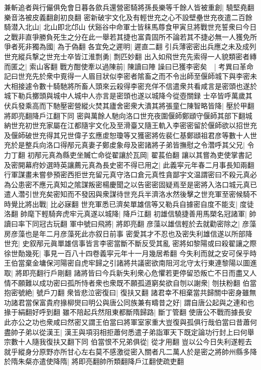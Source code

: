 兼斬追者與行儼俱免會日暮各歛兵還營密騎將孫長樂等千餘人皆被重創|{
	驍堅堯翻樂音洛被皮義翻創初良翻}
密新破宇文化及有輕世充之心不設壁壘世充夜遣二百餘騎潜入北山|{
	北山即北邙山}
伏谿谷中命軍士皆秣馬蓐食甲寅旦將戰世充誓衆曰今日之戰非直爭勝負死生之分在此一舉若其捷也富貴固所不論若其不捷必無一人獲免所爭者死非獨為國|{
	為于偽翻}
各宜免之遲明|{
	遲直二翻}
引兵薄密密出兵應之未及成列世充縱兵撃之世充士卒皆江淮剽勇|{
	剽匹妙翻}
出入如飛世充先索得一人貌類密者縳而匿之|{
	索山客翻}
戰方酣使牽以過陳前|{
	陳讀曰陣}
譟曰已獲李密矣　|{
	考異曰革命記曰世充先於衆中覔得一人眉目狀似李密者隂畜之而不令出師至偃師城下與李密未大相接遽令數十騎馳將所畜人頭來云殺得李密充佯不信遣衆共看咸言是密頭也遂於城下勒兵擲頭與城中人城中人亦言是密頭也遂以城降今從壺關録}
士卒皆呼萬歲其伏兵發乘高而下馳壓密營縱火焚其廬舍密衆大潰其將張童仁陳智略皆降|{
	壓於甲翻將即亮翻降戶江翻下同}
密與萬餘人馳向洛口世充夜圍偃師鄭頲守偃師其部下翻城納世充初世充家屬在江都隨宇文化及至滑臺又隨王軌入李密密留於偃師欲以招世充及偃師破世充得其兄世偉子玄應䖍恕瓊等又獲密將佐裴仁基鄭頲祖君彦等數十人世充於是整兵向洛口得邴元真妻子鄭䖍象母及密諸將子弟皆撫慰之令濳呼其父兄|{
	令力丁翻}
初邴元真為縣吏坐贓亡命從翟讓於瓦岡|{
	翟萇伯翻}
讓以其嘗為吏使掌書記及密開幕府妙選時英讓薦元真為長史密不得已用之|{
	此義寜元年春二月事長知兩翻}
行軍謀畫未嘗參預密西拒世充留元真守洛口倉元真性貪鄙宇文温謂密曰不殺元真必為公患密不應元真知之隂謀叛密楊慶聞之以告密密固疑焉至是密將入洛口城元真已遣人濳引世充矣密知而不發因與衆謀待世充兵半濟洛水然後擊之世充軍至密候騎不時覺比將出戰|{
	比必寐翻}
世充軍悉已濟矣單雄信等又勒兵自據密自度不能支|{
	度徒洛翻}
帥麾下輕騎奔虎牢元真遂以城降|{
	降戶江翻}
初雄信驍捷善用馬槊名冠諸軍|{
	帥讀曰率下同冠古玩翻}
軍中號曰飛將|{
	將即亮翻}
彦藻以雄信輕於去就勸密除之|{
	彦藻房彦藻也是年二月彦藻死此亦叙日前事}
密愛其才不忍也及密失利雄信遂以所部降世充|{
	史叙邴元眞單雄信事皆言李密當斷不斷反受其亂}
密將如黎陽或曰殺翟讓之際徐世勣幾死|{
	事見一百八十四卷義寜元年十一月幾居希翻}
今失利而就之安可保乎時王伯當棄金墉保河陽密自虎牢歸之引諸將共議密欲南阻河北守太行東連黎陽以圖進取|{
	將即亮翻行戶剛翻}
諸將皆曰今兵新失利衆心危懼若更停留恐叛亡不日而盡又人情不願難以成功密曰孤所恃者衆也衆既不願孤道窮矣欲自刎以謝衆|{
	刎扶粉翻}
伯當抱密號絶|{
	號戶刀翻}
衆皆悲泣密復曰|{
	復扶又翻}
諸君幸不相棄當共歸關中密身雖無功諸君當保富貴府掾柳爕曰明公與唐公同族兼有疇昔之好|{
	謂自唐公起與之連和也掾于絹翻好呼到翻}
雖不陪起兵然阻東都斷隋歸路|{
	斷丁管翻}
使唐公不戰而據長安此亦公之功也衆咸曰然密又謂王伯當曰將軍室家重大豈復與孤俱行哉伯當曰昔蕭何盡帥子弟以從漢王|{
	漢王與項羽相拒蕭何悉遣子弟詣軍天下既定論功行封上曰何舉宗數十人隨我復扶又翻下同}
伯當恨不兄弟俱從|{
	從才用翻}
豈以公今日失利遂輕去就乎縱身分原野亦所甘心左右莫不感激從密入關者凡二萬人於是密之將帥州縣多降於隋朱粲亦遣使降隋|{
	將即亮翻帥所類翻降戶江翻使疏吏翻}
